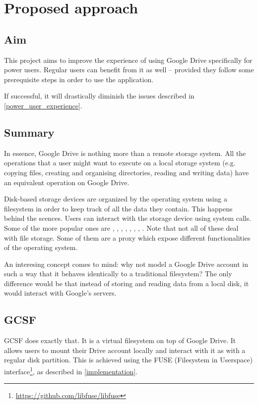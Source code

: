 \chapter{Proposed approach}

\section{Aim}

This project aims to improve the experience of using Google Drive specifically for power users. Regular users can benefit from it as well -- provided they follow some prerequisite steps in order to use the application.

If successful, it will drastically diminish the issues described in \ref{power_user_experience}.

\section{Summary}

In essence, Google Drive is nothing more than a remote storage system. All the operations that a user might want to execute on a local storage system (e.g. copying files, creating and organising directories, reading and writing data) have an equivalent operation on Google Drive.

Disk-based storage devices are organized by the operating system using a filesystem in order to keep track of all the data they contain. This happens behind the scences. Users can interact with the storage device using system calls. Some of the more popular ones are , , , , , , , . Note that not all of these deal with file storage. Some of them are a proxy which expose different functionalities of the operating system.

An interesing concept comes to mind: why not model a Google Drive account in such a way that it behaves identically to a traditional filesystem? The only difference would be that instead of storing and reading data from a local disk, it would interact with Google's servers.

\section{GCSF}

GCSF does exactly that. It is a virtual filesystem on top of Google Drive. It allows users to mount their Drive account locally and interact with it as with a regular disk partition. This is achieved using the FUSE (Filesystem in Userspace) interface\footnote{\url{https://github.com/libfuse/libfuse}}, as described in \ref{implementation}.

